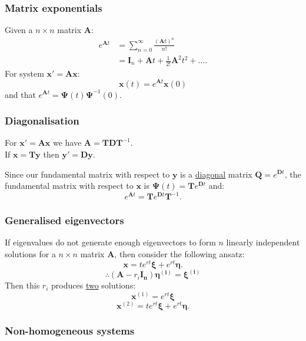 \documentclass{article}
\newcommand{\matr}[1]{\mathbf{#1}}
\begin{document}
\begin{multicols}{3}
\subsubsection*{Matrix exponentials}
Given a $n\times n$ matrix $\boldsymbol{A}$:
\begin{align*}
    e^{\boldsymbol{A}t}
    &=\sum_{n=0}^{\infty}
    \frac{(\boldsymbol{A}t)^n}{n!} \\
    &=\boldsymbol{I}_n
    +\boldsymbol{A}t
    +\frac{1}{2!}\boldsymbol{A}^2t^2+\dots.
\end{align*}
For system 
$\boldsymbol{x}'=\boldsymbol{A}\boldsymbol{x}$:
$$\boldsymbol{x}(t)
=e^{\boldsymbol{A}t}\boldsymbol{x}(0)$$
and that $e^{\boldsymbol{A}t}
=\boldsymbol{\Psi}(t)\boldsymbol{\Psi}^{-1}(0)$.

\subsubsection*{Diagonalisation}
For $\boldsymbol{x}'
=\boldsymbol{A}\boldsymbol{x}$ we have
$\boldsymbol{A}=\boldsymbol{T}
\boldsymbol{D}\boldsymbol{T}^{-1}$. \\
If $\boldsymbol{x}=\boldsymbol{T}
\boldsymbol{y}$ then $\boldsymbol{y}'=\boldsymbol{D}\boldsymbol{y}$.

Since our fundamental matrix with respect to
$\boldsymbol{y}$ is a \underline{diagonal} matrix
$\boldsymbol{Q}=e^{\boldsymbol{D}t}$,
the fundamental matrix with respect to
$\boldsymbol{x}$ is
$\boldsymbol{\Psi}(t)
=\boldsymbol{T}e^{\boldsymbol{D}t}$
and:
$$e^{\boldsymbol{A}t}=\boldsymbol{T}
e^{\boldsymbol{D}t}\boldsymbol{T}^{-1}.$$

\subsubsection*{Generalised eigenvectors}
If eigenvalues do not generate enough eigenvectors to
form $n$ linearly independent solutions for a
$n\times n$ matrix $\boldsymbol{A}$, 
then consider the following ansatz:
$$\boldsymbol{x}=te^{rt} \boldsymbol{\xi}+e^{rt} \boldsymbol{\eta}.$$
$$\therefore(\matr{A}-r_i \matr{I_n})\boldsymbol{\eta^{(i)}}=\boldsymbol{\xi^{(i)}}$$
Then this $r_i$ produces \underline{two} solutions:
$$\boldsymbol{x}^{(1)}=e^{rt}\boldsymbol{\xi}$$
$$\boldsymbol{x}^{(2)}
=te^{rt} \boldsymbol{\xi}+e^{rt} \boldsymbol{\eta}.$$
    
\subsubsection*{Non-homogeneous systems}


\end{multicols}
\end{document}
